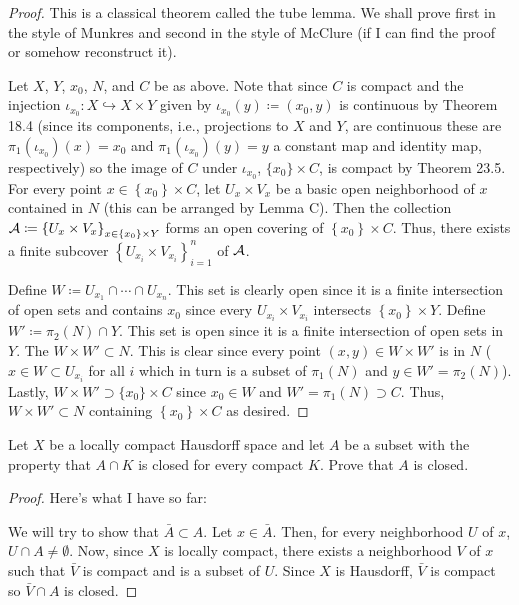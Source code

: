 \begin{proof}
This is a classical theorem called the tube lemma. We shall prove first in
the style of Munkres and second in the style of McClure (if I can find the
proof or somehow reconstruct it).

Let $X$, $Y$, $x_0$, $N$, and $C$ be as above. Note that since $C$ is
compact and the injection $\iota_{x_0}\colon X\hookrightarrow X\times Y$
given by $\iota_{x_0}(y)\coloneqq(x_0,y)$ is continuous by Theorem 18.4 (since
its components, i.e., projections to $X$ and $Y$, are continuous these are
$\pi_1(\iota_{x_0})(x)=x_0$ and $\pi_1(\iota_{x_0})(y)=y$ a constant map
and identity map, respectively) so the image of $C$ under $\iota_{x_0}$,
$\{x_0\}\times C$, is compact by Theorem 23.5. For every point
$x\in\left\{x_0\right\}\times C$, let $U_x\times V_x$ be a basic open
neighborhood of $x$ contained in $N$ (this can be arranged by Lemma
C). Then the collection $\mathcal{A}\coloneqq\left\{U_x\times
  V_x\right\}_{x\in\left\{x_0\right\}\times   Y}$ forms an open covering of
$\left\{x_0\right\}\times C$. Thus, there exists a finite subcover
$\left\{U_{x_i}\times V_{x_i}\right\}_{i=1}^n$ of $\mathcal{A}$.

Define $W\coloneqq U_{x_1}\cap\dotsb\cap U_{x_n}$. This set is clearly open
since it is a finite intersection of open sets and contains $x_0$ since
every $U_{x_i}\times V_{x_i}$ intersects $\left\{x_0\right\}\times
Y$. Define $W'\coloneqq\pi_2(N)\cap Y$. This set is open since it is a
finite intersection of open sets in $Y$. The $W\times W'\subset N$. This is
clear since every point $(x,y)\in W\times W'$ is in $N$ ($x\in
W\subset U_{x_i}$ for all $i$ which in turn is a subset of $\pi_1(N)$ and
$y\in W'=\pi_2(N)$). Lastly, $W\times W'\supset \{x_0\}\times C$ since
$x_0\in W$ and $W'=\pi_1(N)\supset C$. Thus, $W\times W'\subset N$
containing $\left\{x_0\right\}\times C$ as desired.
\end{proof}
\begin{problem}
Let $X$ be a locally compact Hausdorff space and let $A$ be a subset with
the property that $A\cap K$ is closed for every compact $K$. Prove that $A$
is closed.
\end{problem}
\begin{proof}
Here's what I have so far:

We will try to show that $\bar A\subset A$. Let $x\in\bar A$. Then, for
every neighborhood $U$ of $x$, $U\cap A\neq\emptyset$. Now, since $X$ is
locally compact, there exists a neighborhood $V$ of $x$ such that $\bar V$
is compact and is a subset of $U$. Since $X$ is Hausdorff, $\bar V$ is
compact so $\bar V\cap A$ is closed.
\end{proof}
